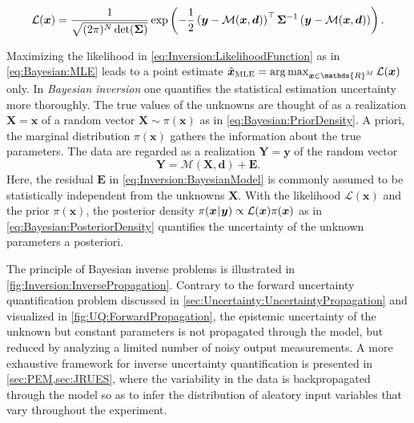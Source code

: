 \begin{equation} \label{eq:Inversion:LikelihoodFunction}
  \mathcal{L}(\bm{x}) = \frac{1}{\sqrt{(2\pi)^{N} \det(\bm{\Sigma})}}
  \exp \left( - \frac{1}{2} \left( \bm{y}-\mathcal{M}(\bm{x},\bm{d}) \right)^\top \bm{\Sigma}^{-1} \left( \bm{y}-\mathcal{M}(\bm{x},\bm{d}) \right) \right).
\end{equation}
\par %
Maximizing the likelihood in \cref{eq:Inversion:LikelihoodFunction} as in \cref{eq:Bayesian:MLE} leads to a point estimate
\(\hat{\bm{x}}_{\mathrm{MLE}} = \operatorname{arg\,max}_{\bm{x} \in \mathds{R}^\dimParam} \mathcal{L}(\bm{x})\) only.
In \emph{Bayesian inversion} one quantifies the statistical estimation uncertainty more thoroughly.
The true values of the unknowns are thought of as a realization \(\bm{X} = \bm{x}\) of a random vector \(\bm{X} \sim \pi(\bm{x})\) as in \cref{eq:Bayesian:PriorDensity}.
A priori, the marginal distribution \(\pi(\bm{x})\) gathers the information about the true parameters.
The data are regarded as a realization \(\bm{Y} = \bm{y}\) of the random vector
\begin{equation} \label{eq:Inversion:BayesianModel}
  \bm{Y} = \mathcal{M}(\bm{X},\bm{d}) + \bm{E}.
\end{equation}
Here, the residual \(\bm{E}\) in \cref{eq:Inversion:BayesianModel} is commonly assumed to be statistically independent from the unknowns \(\bm{X}\).
With the likelihood \(\mathcal{L}(\bm{x})\) and the prior \(\pi(\bm{x})\), the posterior density \(\pi(\bm{x} {\:\!}|{\:\!} \bm{y}) \propto \mathcal{L}(\bm{x}) \pi(\bm{x})\)
as in \cref{eq:Bayesian:PosteriorDensity} quantifies the uncertainty of the unknown parameters a posteriori.
\par %
The principle of Bayesian inverse problems is illustrated in \cref{fig:Inversion:InversePropagation}.
Contrary to the forward uncertainty quantification problem discussed in \cref{sec:Uncertainty:UncertaintyPropagation} and visualized in \cref{fig:UQ:ForwardPropagation},
the epistemic uncertainty of the unknown but constant parameters is not propagated through the model, but reduced by analyzing a limited number of noisy output measurements.
A more exhaustive framework for inverse uncertainty quantification is presented in \cref{sec:PEM,sec:JRUES},
where the variability in the data is backpropagated through the model so as to infer the distribution of aleatory input variables that vary throughout the experiment.
